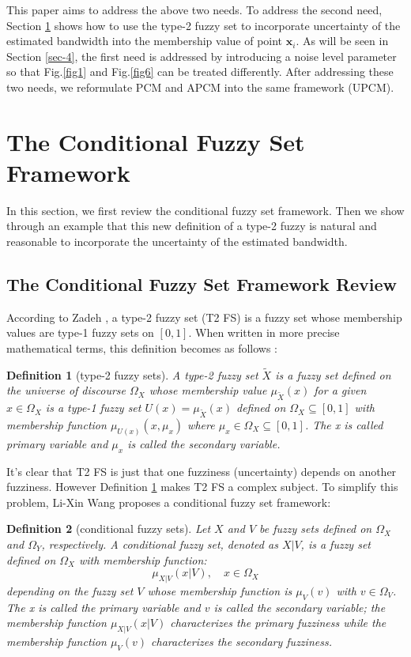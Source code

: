\documentclass[journal,transmag]{IEEEtran}
\newtheorem{definition}{Definition}
\begin{document}
This paper aims to address the above two needs.
To address the second need, Section \ref{sec-3} shows how to use the type-2 fuzzy set to incorporate uncertainty of the estimated bandwidth into the membership value of point $\mathbf{x}_i$. As will be seen in Section \ref{sec-4}, the first need is addressed by introducing a noise level parameter so that Fig.\ref{fig1} and Fig.\ref{fig6} can be treated differently. After addressing these two needs, we reformulate PCM and APCM into the same framework (UPCM).
\section{The Conditional Fuzzy Set Framework}
\label{sec-3}
In this section, we first review the conditional fuzzy set framework. Then we show through an example that this new definition of a type-2 fuzzy is natural and reasonable to incorporate the uncertainty of the estimated bandwidth.
\subsection{The Conditional Fuzzy Set Framework Review}
\label{sec-3-1}
According to Zadeh \cite{zadeh_concept_1975}, a type-2 fuzzy set (T2 FS) is a fuzzy set whose membership values are type-1 fuzzy sets on $[0,1]$. When written in more precise mathematical terms, this definition becomes as follows \cite{wang_new_2016}:

\begin{definition}[type-2 fuzzy sets]
\label{type2-fs}
A type-2 fuzzy set $\tilde{X}$ is a fuzzy set defined on the universe of discourse $\Omega_X$ whose membership value $\mu_{\tilde{X}}(x)$ for a given $x\in\Omega_X$ is a type-1 fuzzy set  $U(x)=\mu_{\tilde{X}}(x)$ defined on $\Omega_X\subseteq[0,1]$ with membership function $\mu_{U(x)}(x,\mu_x)$ where $\mu_x\in\Omega_X\subseteq[0,1]$. The x is called \emph{primary variable} and $\mu_x$ is called the \emph{secondary variable}.
\end{definition}

It's clear that T2 FS is just that one fuzziness (uncertainty) depends on another fuzziness. However Definition \ref{type2-fs} makes T2 FS a complex subject. To simplify this problem, Li-Xin Wang \cite{wang_new_2016} proposes a conditional fuzzy set framework:

\begin{definition}[conditional fuzzy sets]
\label{conditional-fs}
Let $X$ and $V$ be fuzzy sets defined on $\Omega_X$ and $\Omega_Y$, respectively. A \emph{conditional fuzzy set}, denoted as $X|V$, is a fuzzy set defined on $\Omega_X$ with membership function:
\begin{equation}
\mu_{X|V}(x|V),\quad  x\in\Omega_X
\end{equation}
depending on the fuzzy set $V$ whose membership function is $\mu_V(v)$ with $v\in\Omega_V$. The x is called the \emph{primary variable} and $v$ is called the \emph{secondary variable}; the membership function $\mu_{X|V}(x|V)$ characterizes the \emph{primary fuzziness} while the membership function $\mu_V(v)$ characterizes the \emph{secondary fuzziness}.
\end{definition}
\end{document}
